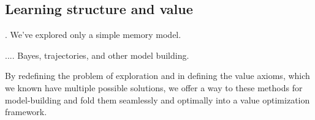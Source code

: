 \documentclass[9pt,twocolumn,twoside]{pnas-new}
\begin{document}
\subsection*{Learning structure and value}.
We've explored only a simple memory model. 

.... Bayes, trajectories, and other model building.

By redefining the problem of exploration and in defining the value axioms, which we known have multiple possible solutions, we offer a way to these methods for model-building and fold them seamlessly and optimally into a value optimization framework. 


\end{document}
